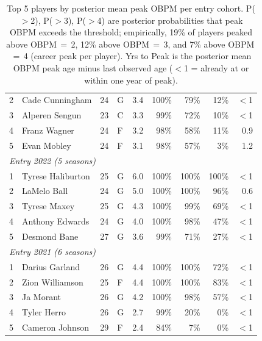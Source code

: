 \begin{table}[htbp]
\begin{tabular}{rlrlrrrrr}
    2 & Cade Cunningham & 24 & G & 3.4 & 100\% & 79\% & 12\% & $<$1 \\
    3 & Alperen Sengun & 23 & C & 3.3 & 99\% & 72\% & 10\% & $<$1 \\
    4 & Franz Wagner & 24 & F & 3.2 & 98\% & 58\% & 11\% & 0.9 \\
    5 & Evan Mobley & 24 & F & 3.1 & 98\% & 57\% & 3\% & 1.2 \\
    \midrule[0.4pt]
    \multicolumn{9}{l}{\textit{Entry 2022 (5 seasons)}} \\
    \midrule
    1 & Tyrese Haliburton & 25 & G & 6.0 & 100\% & 100\% & 100\% & $<$1 \\
    2 & LaMelo Ball & 24 & G & 5.0 & 100\% & 100\% & 96\% & 0.6 \\
    3 & Tyrese Maxey & 25 & G & 4.3 & 100\% & 99\% & 69\% & $<$1 \\
    4 & Anthony Edwards & 24 & G & 4.0 & 100\% & 98\% & 47\% & $<$1 \\
    5 & Desmond Bane & 27 & G & 3.6 & 99\% & 71\% & 27\% & $<$1 \\
    \midrule[0.4pt]
    \multicolumn{9}{l}{\textit{Entry 2021 (6 seasons)}} \\
    \midrule
    1 & Darius Garland & 26 & G & 4.4 & 100\% & 100\% & 72\% & $<$1 \\
    2 & Zion Williamson & 25 & F & 4.4 & 100\% & 100\% & 83\% & $<$1 \\
    3 & Ja Morant & 26 & G & 4.2 & 100\% & 98\% & 57\% & $<$1 \\
    4 & Tyler Herro & 26 & G & 2.7 & 99\% & 20\% & 0\% & $<$1 \\
    5 & Cameron Johnson & 29 & F & 2.4 & 84\% & 7\% & 0\% & $<$1 \\
    \bottomrule
  \end{tabular}
  \caption{Top 5 players by posterior mean peak OBPM per entry cohort. P($>$2), P($>$3), P($>$4) are posterior probabilities that peak OBPM exceeds the threshold; empirically, 19\% of players peaked above OBPM\,$=$\,2, 12\% above OBPM\,$=$\,3, and 7\% above OBPM\,$=$\,4 (career peak per player). Yrs to Peak is the posterior mean OBPM peak age minus last observed age ($<$1 = already at or within one year of peak).}
  \label{tab:breakout_cohort}
\end{table}

